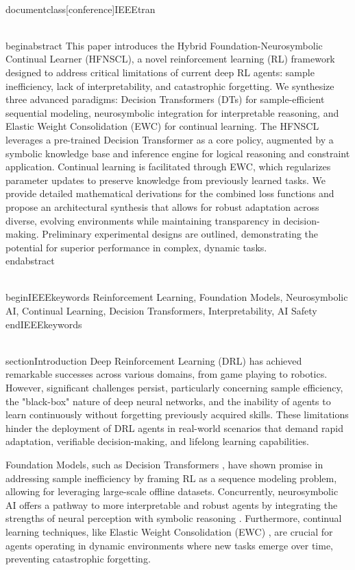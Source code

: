 \\documentclass[conference]{IEEEtran}
\begin{document}
\\begin{abstract}
This paper introduces the Hybrid Foundation-Neurosymbolic Continual Learner (HFNSCL), a novel reinforcement learning (RL) framework designed to address critical limitations of current deep RL agents: sample inefficiency, lack of interpretability, and catastrophic forgetting. We synthesize three advanced paradigms: Decision Transformers (DTs) for sample-efficient sequential modeling, neurosymbolic integration for interpretable reasoning, and Elastic Weight Consolidation (EWC) for continual learning. The HFNSCL leverages a pre-trained Decision Transformer as a core policy, augmented by a symbolic knowledge base and inference engine for logical reasoning and constraint application. Continual learning is facilitated through EWC, which regularizes parameter updates to preserve knowledge from previously learned tasks. We provide detailed mathematical derivations for the combined loss functions and propose an architectural synthesis that allows for robust adaptation across diverse, evolving environments while maintaining transparency in decision-making. Preliminary experimental designs are outlined, demonstrating the potential for superior performance in complex, dynamic tasks.
\\end{abstract}

\\begin{IEEEkeywords}
Reinforcement Learning, Foundation Models, Neurosymbolic AI, Continual Learning, Decision Transformers, Interpretability, AI Safety
\\end{IEEEkeywords}

\\section{Introduction}
Deep Reinforcement Learning (DRL) has achieved remarkable successes across various domains, from game playing to robotics. However, significant challenges persist, particularly concerning sample efficiency, the "black-box" nature of deep neural networks, and the inability of agents to learn continuously without forgetting previously acquired skills. These limitations hinder the deployment of DRL agents in real-world scenarios that demand rapid adaptation, verifiable decision-making, and lifelong learning capabilities.

Foundation Models, such as Decision Transformers \cite{chen2021decision}, have shown promise in addressing sample inefficiency by framing RL as a sequence modeling problem, allowing for leveraging large-scale offline datasets. Concurrently, neurosymbolic AI offers a pathway to more interpretable and robust agents by integrating the strengths of neural perception with symbolic reasoning \cite{garnelo2019neural}. Furthermore, continual learning techniques, like Elastic Weight Consolidation (EWC) \cite{kirkpatrick2017overcoming}, are crucial for agents operating in dynamic environments where new tasks emerge over time, preventing catastrophic forgetting.
\end{document}
